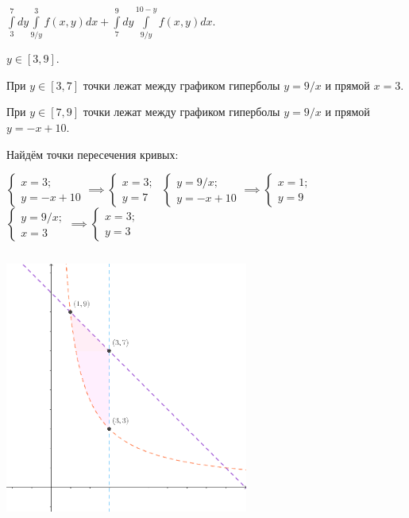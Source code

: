 \documentclass[a4paper, fleqn]{article}
\begin{document}
    $\int\limits_{3}^{7} dy \int\limits_{9/y}^{3}f(x,y)dx +\int\limits_{7}^{9} dy \int\limits_{9/y}^{10 - y}f(x,y)dx. $
    
    $y \in [3, 9].$
    
    При $y \in [3,7]$ точки лежат между графиком гиперболы $y = 9/x$ и прямой $x = 3$.
    
    При $y \in [7,9]$ точки лежат между графиком гиперболы $y = 9/x$ и прямой $y = -x + 10$.
    
    Найдём точки пересечения кривых:
    
    $\begin{cases}
    x = 3;\\
    y = -x + 10
    \end{cases} \implies
    \begin{cases}
    x = 3;\\
    y = 7
    \end{cases}$ $\begin{cases}
    y = 9/x;\\
    y = -x + 10
    \end{cases} \implies
    \begin{cases}
    x = 1;\\
    y = 9
    \end{cases}$ $\begin{cases}
    y = 9/x;\\
    x = 3
    \end{cases} \implies
    \begin{cases}
    x = 3;\\
    y = 3
    \end{cases}$ 
    
    \includegraphics[width=8cm, height=9cm]{task 7.png}
    
\end{document}
